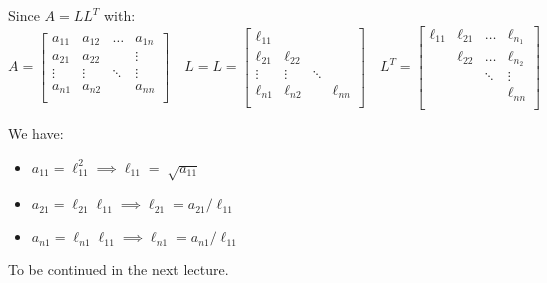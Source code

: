 \documentclass[../main/main.tex]{subfiles}
\begin{document}
    Since $A = L L^{T}$ with: \[
      A=
\begin{bmatrix}
a_{11} &a_{12}&\ldots&a_{1n} \\
a_{21} &a_{22}&&\vdots \\
\vdots &\vdots&\ddots& \vdots\\
a_{n1} &a_{n2}&&a_{nn} \\
\end{bmatrix}
\quad L = L = \begin{bmatrix}
\ell_{11} &&& \\
\ell_{21} &\ell_{22}&& \\
\vdots &\vdots&\ddots& \\
\ell_{n1} &\ell_{n2}&&\ell_{nn} \\
      \end{bmatrix}
      \quad
L^{T} =  \begin{bmatrix}
\ell_{11} &\ell_{21}&\ldots& \ell_{n_1} \\
 &\ell_{22}&\ldots&\ell_{n_2} \\
&&\ddots&\vdots \\
 &&&\ell_{nn} \\
\end{bmatrix}
    \]

    We have:
    \begin{itemize}
\item $a_{11} = \ell_{11}^2 \implies \ell_{11} = \sqrt[]{a_{11}}$
            \item $a_{21}= \ell_{21}\ell_{11} \implies \ell_{21} = a_{21} / \ell_{11}$
            \item $a_{n1}= \ell_{n1}\ell_{11} \implies \ell_{n1} = a_{n1} / \ell_{11}$
    \end{itemize}
To be continued in the next lecture.
\end{document}
